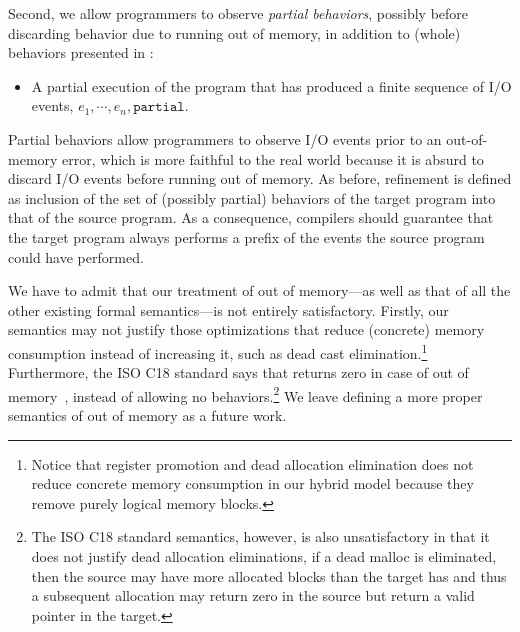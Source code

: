 


Second, we allow programmers to observe \emph{partial behaviors}, possibly before discarding
behavior due to running out of memory, in addition to (whole) behaviors presented in
:
\begin{itemize}
\item A partial execution of the program that has produced a finite sequence
of I/O events, $e_1, \cdots, e_n, \mathtt{partial}$.
\end{itemize}
Partial behaviors allow programmers to observe I/O events prior to an out-of-memory error, which is
more faithful to the real world because it is absurd to discard I/O events before running out of
memory.  As before, refinement is defined as inclusion of the set of (possibly partial) behaviors of
the target program into that of the source program.  As a consequence, compilers should guarantee
that the target program always performs a prefix of the events the source program could have
performed.


We have to admit that our treatment of out of memory---as well as that of all the other existing
formal semantics---is not entirely satisfactory.  Firstly, our semantics may not justify those
optimizations that reduce (concrete) memory consumption instead of increasing it, such as dead cast
elimination.\footnote{Notice that register promotion and dead allocation elimination does not reduce
  concrete memory consumption in our hybrid model because they remove purely logical memory blocks.}
Furthermore, the ISO C18 standard says that  returns zero in case of out of
memory~\cite[\S7.22.3p1]{c18}, instead of allowing no behaviors.\footnote{The ISO C18 standard
  semantics, however, is also unsatisfactory in that it does not justify dead allocation
  eliminations, \eg{} if a dead malloc is eliminated, then the source may have more allocated blocks
  than the target has and thus a subsequent allocation may return zero in the source but return a
  valid pointer in the target.}  We leave defining a more proper semantics of out of memory as a
future work.


